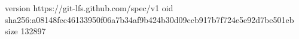 version https://git-lfs.github.com/spec/v1
oid sha256:a08148fec46133950f06a7b34af9b424b30d09ccb917b7f724e5e92d7be501eb
size 132897
